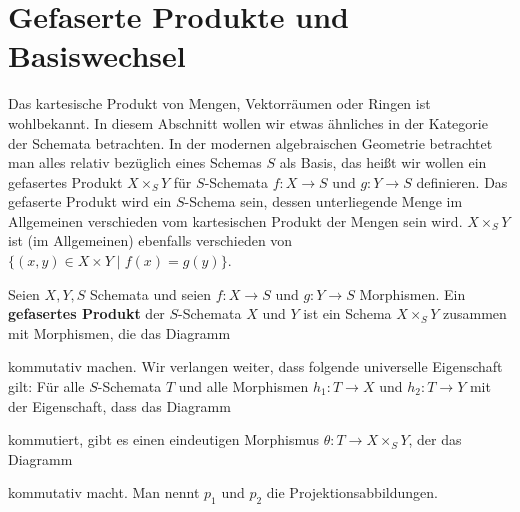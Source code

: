 
\chapter{Gefaserte Produkte und Basiswechsel}
\label{chap:8}
Das kartesische Produkt von Mengen, Vektorräumen oder Ringen ist wohlbekannt. In diesem Abschnitt wollen wir etwas ähnliches in der Kategorie der Schemata betrachten. In der modernen algebraischen Geometrie betrachtet man alles relativ bezüglich eines Schemas $S$ als Basis, das heißt wir wollen ein gefasertes Produkt $X \times_S Y$ für $S$-Schemata $f\colon X \to S$ und $g \colon Y \to S$ definieren. Das gefaserte Produkt wird ein $S$-Schema sein, dessen unterliegende Menge im Allgemeinen verschieden vom kartesischen Produkt der Mengen sein wird. $X \times_S Y$ ist (im Allgemeinen) ebenfalls verschieden von $\{(x,y) \in X \times Y\mid f(x) = g(y)\}$.

\begin{defn}
\label{defn:8.1}
	Seien $X,Y,S$ Schemata und seien $f\colon X \to S$ und $g \colon Y \to S$ Morphismen. Ein \textbf{gefasertes Produkt} der $S$-Schemata $X$ und $Y$ ist ein Schema $X\times_S Y$ zusammen mit Morphismen, die das Diagramm
	\begin{center}
	\end{center}
	kommutativ machen. Wir verlangen weiter, dass folgende universelle Eigenschaft gilt: Für alle $S$-Schemata $T$ und alle Morphismen $h_1\colon T \to X$ und $h_2\colon T \to Y$ mit der Eigenschaft, dass das Diagramm
	\begin{center}
	\end{center}
	kommutiert, gibt es einen eindeutigen Morphismus $\theta\colon T \to X \times_S Y$, der das Diagramm
	\begin{center}
	\end{center}
	kommutativ macht. Man nennt $p_1$ und $p_2$ die Projektionsabbildungen.
\end{defn}

